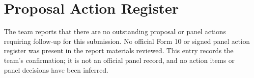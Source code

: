 \chapter{Proposal Action Register}
The team reports that there are no outstanding proposal or panel actions requiring follow-up for this submission. No official Form 10 or signed panel action register was present in the report materials reviewed. This entry records the team's confirmation; it is not an official panel record, and no action items or panel decisions have been inferred.
